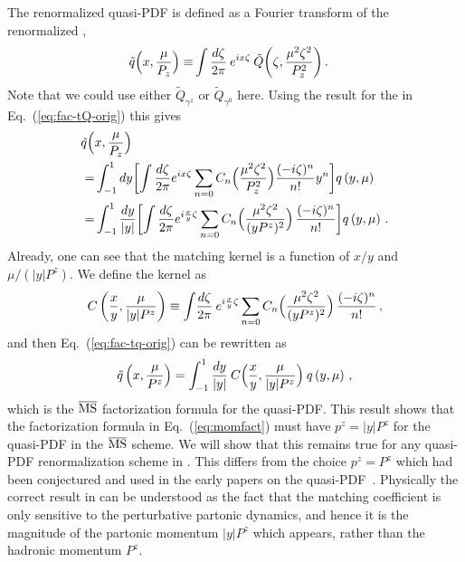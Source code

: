The renormalized quasi-PDF is defined as a Fourier transform of the renormalized \spcorr,
\begin{align} \label{eq:fac-tq-orig0}
\tilde{q} \Bigl(  x, \frac{\mu}{P_z}\Bigr)
\equiv &\int \frac{d \zeta}{2 \pi}\: e^{ix \zeta}\:  \tilde{Q} \biggl(\zeta, \frac{{\mu}^2\zeta^2}{P_z^2}\biggr) \,.
\end{align}
Note that we could use either $\tilde{Q}_{\gamma^z}$ or $\tilde{Q}_{\gamma^0}$ here.
Using the result for the \spcorr in Eq.~(\ref{eq:fac-tQ-orig}) this gives
\begin{align} \label{eq:fac-tq-orig}
\tilde{q} \Bigl( & x, \frac{\mu}{P_z}\Bigr)
 \\
= &  \int_{-1}^1 dy \biggl[ \int \frac{d \zeta}{2 \pi} e^{ix \zeta}
\sum_{n=0} C_n \Bigl( \frac{{\mu}^2\zeta^2}{P_z^2}\Bigr)  \frac{(-i
	\zeta)^n}{n!} y^n \biggr] q \left( y, \mu \right)
\nonumber\\
= &  \int_{-1}^1 {dy\over |y|} \biggl[\int \frac{d \zeta}{2 \pi} e^{i
	\frac{x}{y} \zeta}  \sum_{n=0} C_n \Bigl( \frac{{\mu}^2\zeta^2 }{(yP^z)^2}\Bigr)\,  \frac{(-i \zeta)^n}{n!}  \biggr] q \left( y,\mu \right) \,.
  \nonumber
\end{align}
Already, one can see that the matching kernel is a function of $x / y$
and $\mu / (|y|P^z)$. We define the kernel as
\begin{align}   \label{eq:fac-c}
C \left( {x\over y}, \frac{\mu}{|y|P^z} \right)
   \equiv \int\! \frac{d \zeta}{2 \pi} \: e^{i {x\over y} \zeta}
   \sum_{n=0} C_n \Bigl(
\frac{{\mu}^2\zeta^2}{(yP^z)^2}\Bigr) \, \frac{(-i \zeta)^n}{n!}
 \,,
\end{align}
and then Eq.~(\ref{eq:fac-tq-orig}) can be rewritten as
\begin{align} \label{eq:fac-tq}
\tilde{q} \left( x, \frac{\mu}{P^z}\right)
  = \int_{-1}^1 \frac{dy}{|y|}\: C \Bigl(
   \frac{x}{y}, \frac{\mu}{|y|P^z} \Bigr)\: q \left( y,\mu\right)
   \,,
\end{align}
which is the $\overline{\rm MS}$ factorization formula for the quasi-PDF. This result shows that the factorization formula in Eq.~(\ref{eq:momfact}) must have $p^z=|y|P^z$ for the quasi-PDF in the $\overline{\rm MS}$ scheme. We will show that this remains true for any quasi-PDF renormalization scheme in . This differs
from the choice $p^z=P^z$ which had been conjectured and used in the early papers on the quasi-PDF~\cite{Ji:2013dva,Ji:2014gla,Xiong:2013bka}. Physically the correct result in  can be understood as the fact that the matching coefficient is only sensitive to the perturbative partonic dynamics, and hence it is the magnitude of the partonic momentum $|y| P^z$ which appears, rather than the hadronic momentum $P^z$.


